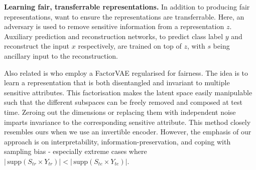 \textbf{Learning fair, transferrable representations.}
In addition to producing fair representations, \cite{madras2018learning} want to ensure the representations are transferrable.
Here, an adversary is used to remove sensitive information from a representation $z$.
Auxiliary prediction and reconstruction networks, to predict class label $y$
and reconstruct the input $x$ respectively,
are trained on top of $z$, with $s$ being ancillary input to the reconstruction.

Also related is \cite{creager2019flexibly} who employ a FactorVAE \cite{kim2018disentangling} regularised for fairness.
The idea is to learn a representation that is both disentangled and invariant to multiple sensitive attributes.
This factorisation makes the latent space easily manipulable such that the different subspaces can be freely removed and composed at test time.
Zeroing out the dimensions or replacing them with independent noise imparts invariance to the corresponding sensitive attribute.
This method closely resembles ours when we use an invertible encoder.
However, the emphasis of our approach is on interpretability, information-preservation, and coping with sampling bias - especially extreme cases where $|\, \textrm{supp}(S_{tr} \times Y_{tr}) | < |\, \textrm{supp}(S_{te} \times Y_{te}) |$.

